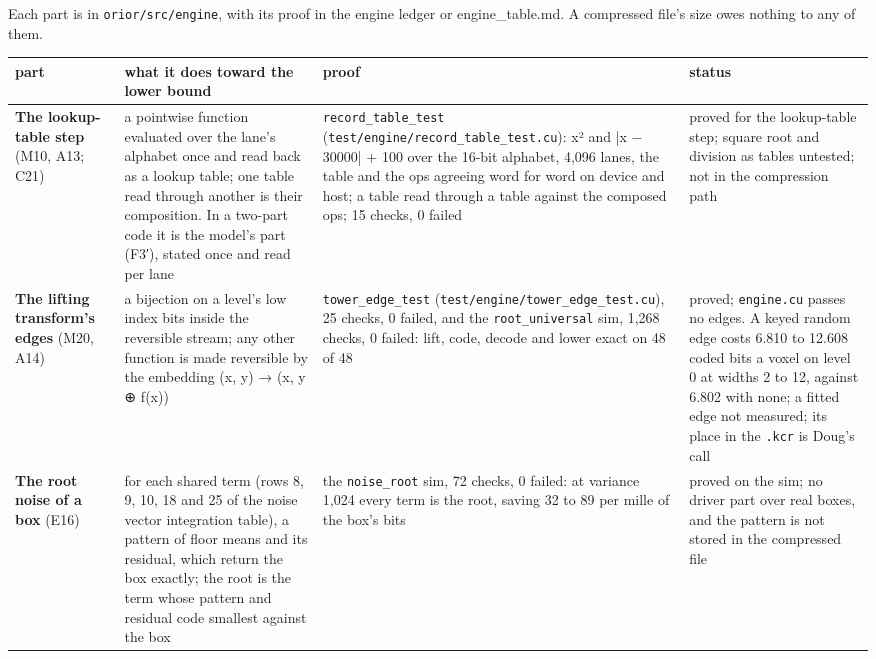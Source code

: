 Each part is in \texttt{orior/\allowbreak{}src/\allowbreak{}engine}, with its proof in the engine ledger or engine\_\allowbreak{}table.md. A compressed file's size owes nothing to any of them.

{\footnotesize
\setlength{\tabcolsep}{6pt}
\begin{longtable}{>{\RaggedRight\arraybackslash}p{}>{\RaggedRight\arraybackslash}p{}>{\RaggedRight\arraybackslash}p{}>{\RaggedRight\arraybackslash}p{}}
\toprule
part & what it does toward the lower bound & proof & status \\
\midrule
\endhead
\textbf{The lookup-table step} (M10, A13; C21) & a pointwise function evaluated over the lane's alphabet once and read back as a lookup table; one table read through another is their composition. In a two-part code it is the model's part (F3′), stated once and read per lane & \texttt{record\_\allowbreak{}table\_\allowbreak{}test} (\texttt{test/\allowbreak{}engine/\allowbreak{}record\_\allowbreak{}table\_\allowbreak{}test.\allowbreak{}cu}): x² and |x − 30000| + 100 over the 16-bit alphabet, 4,096 lanes, the table and the ops agreeing word for word on device and host; a table read through a table against the composed ops; 15 checks, 0 failed & proved for the lookup-table step; square root and division as tables untested; not in the compression path \\
\textbf{The lifting transform's edges} (M20, A14) & a bijection on a level's low index bits inside the reversible stream; any other function is made reversible by the embedding (x, y) → (x, y ⊕ f(x)) & \texttt{tower\_\allowbreak{}edge\_\allowbreak{}test} (\texttt{test/\allowbreak{}engine/\allowbreak{}tower\_\allowbreak{}edge\_\allowbreak{}test.\allowbreak{}cu}), 25 checks, 0 failed, and the \texttt{root\_\allowbreak{}universal} sim, 1,268 checks, 0 failed: lift, code, decode and lower exact on 48 of 48 & proved; \texttt{engine.\allowbreak{}cu} passes no edges. A keyed random edge costs 6.810 to 12.608 coded bits a voxel on level 0 at widths 2 to 12, against 6.802 with none; a fitted edge not measured; its place in the \texttt{.\allowbreak{}kcr} is Doug's call \\
\textbf{The root noise of a box} (E16) & for each shared term (rows 8, 9, 10, 18 and 25 of the noise vector integration table), a pattern of floor means and its residual, which return the box exactly; the root is the term whose pattern and residual code smallest against the box & the \texttt{noise\_\allowbreak{}root} sim, 72 checks, 0 failed: at variance 1,024 every term is the root, saving 32 to 89 per mille of the box's bits & proved on the sim; no driver part over real boxes, and the pattern is not stored in the compressed file \\

\end{longtable}}
